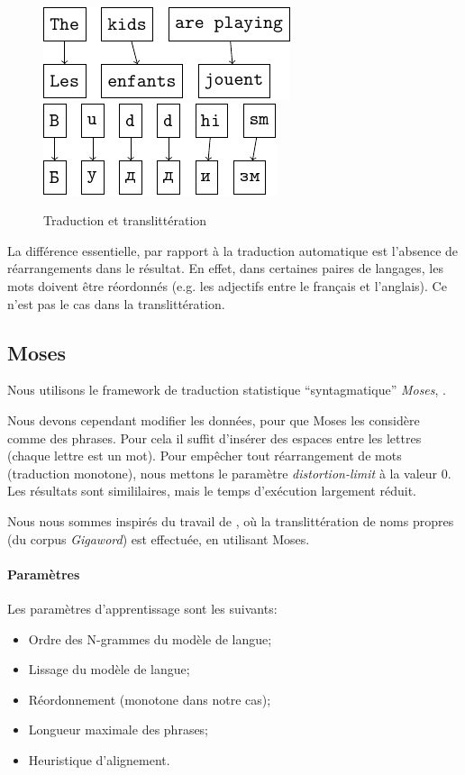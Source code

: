 \documentclass{article}
\begin{document}
\begin{figure}[H]
\caption{Traduction et translittération}
\centering
\vspace{0.3cm}
\includegraphics{word_alignment.pdf}
\hspace{0.5cm}
\includegraphics{letter_alignment.pdf}
\end{figure}

La différence essentielle, par rapport à la traduction automatique est l'absence de réarrangements dans le résultat. En effet, dans certaines paires de langages, les mots doivent être réordonnés (e.g. les adjectifs entre le français et l'anglais). Ce n'est pas le cas dans la translittération.

\subsection{Moses}
Nous utilisons le framework de traduction statistique ``syntagmatique'' \emph{Moses}, \cite{Koehn07}.

Nous devons cependant modifier les données, pour que Moses les considère comme des phrases. Pour cela il suffit d'insérer des espaces entre les lettres (chaque lettre est un mot). Pour empêcher tout réarrangement de mots (traduction monotone), nous mettons le paramètre \emph{distortion-limit} à la valeur $0$. Les résultats sont simililaires, mais le temps d'exécution largement réduit.


Nous nous sommes inspirés du travail de \cite{Matthews}, où la translittération de noms propres (du corpus \emph{Gigaword}) est effectuée, en utilisant Moses.

\paragraph{Paramètres}

Les paramètres d'apprentissage sont les suivants:
\begin{itemize}
    \item Ordre des N-grammes du modèle de langue;
    \item Lissage du modèle de langue;
    \item Réordonnement (monotone dans notre cas);
    \item Longueur maximale des phrases;
    \item Heuristique d'alignement.
\end{itemize}
\end{document}

